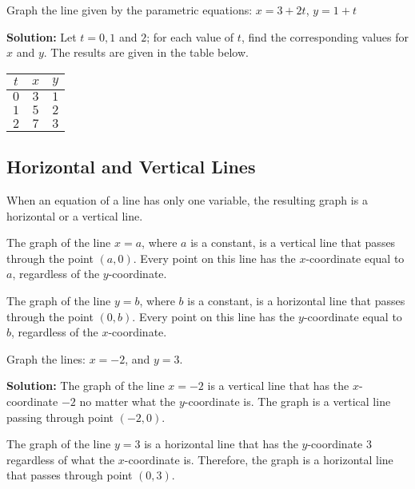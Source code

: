 \begin{example}
Graph the line given by the parametric equations: $x = 3 + 2t$, $y = 1 + t$
\end{example}

\textbf{Solution:} Let $t = 0, 1$ and $2$; for each value of $t$, find the corresponding values for $x$ and $y$. The results are given in the table below.

\begin{center}
\begin{tabular}{c|c|c}
    $t$ & $x$ & $y$ \\
    \hline
    $0$ & $3$ & $1$ \\
    $1$ & $5$ & $2$ \\
    $2$ & $7$ & $3$ \\
\end{tabular}
\end{center}


\subsection{Horizontal and Vertical Lines}

When an equation of a line has only one variable, the resulting graph is a horizontal or a vertical line.

The graph of the line \(x = a\), where \(a\) is a constant, is a vertical line that passes through the point \((a, 0)\). Every point on this line has the \(x\)-coordinate equal to \(a\), regardless of the \(y\)-coordinate.

The graph of the line \(y = b\), where \(b\) is a constant, is a horizontal line that passes through the point \((0, b)\). Every point on this line has the \(y\)-coordinate equal to \(b\), regardless of the \(x\)-coordinate.

\begin{example}
Graph the lines: \(x = -2\), and \(y = 3\).
\end{example}

\textbf{Solution:} The graph of the line \(x = -2\) is a vertical line that has the \(x\)-coordinate \(-2\) no matter what the \(y\)-coordinate is. The graph is a vertical line passing through point \((-2, 0)\).

The graph of the line \(y = 3\) is a horizontal line that has the \(y\)-coordinate \(3\) regardless of what the \(x\)-coordinate is. Therefore, the graph is a horizontal line that passes through point \((0, 3)\).

